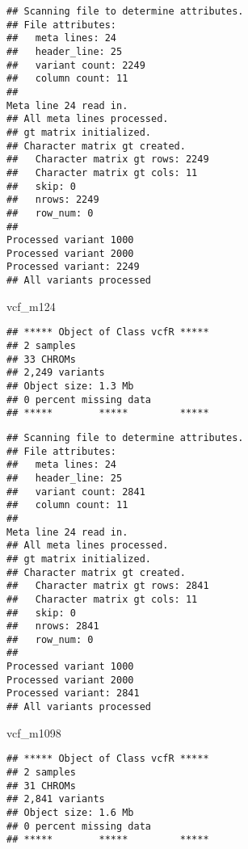 \documentclass[]{article}
\newenvironment{Shaded}{\begin{snugshade}}{\end{snugshade}}
\newcommand{\DataTypeTok}[1]{\textcolor[rgb]{0.13,0.29,0.53}{#1}}
\newcommand{\KeywordTok}[1]{\textcolor[rgb]{0.13,0.29,0.53}{\textbf{#1}}}
\newcommand{\NormalTok}[1]{#1}
\newcommand{\OperatorTok}[1]{\textcolor[rgb]{0.81,0.36,0.00}{\textbf{#1}}}
\newcommand{\StringTok}[1]{\textcolor[rgb]{0.31,0.60,0.02}{#1}}
\begin{document}
\begin{verbatim}
## Scanning file to determine attributes.
## File attributes:
##   meta lines: 24
##   header_line: 25
##   variant count: 2249
##   column count: 11
## 
Meta line 24 read in.
## All meta lines processed.
## gt matrix initialized.
## Character matrix gt created.
##   Character matrix gt rows: 2249
##   Character matrix gt cols: 11
##   skip: 0
##   nrows: 2249
##   row_num: 0
## 
Processed variant 1000
Processed variant 2000
Processed variant: 2249
## All variants processed
\end{verbatim}

\begin{Shaded}
\begin{Highlighting}[]
\NormalTok{vcf_m124}
\end{Highlighting}
\end{Shaded}

\begin{verbatim}
## ***** Object of Class vcfR *****
## 2 samples
## 33 CHROMs
## 2,249 variants
## Object size: 1.3 Mb
## 0 percent missing data
## *****        *****         *****
\end{verbatim}

\begin{Shaded}
\end{Shaded}

\begin{verbatim}
## Scanning file to determine attributes.
## File attributes:
##   meta lines: 24
##   header_line: 25
##   variant count: 2841
##   column count: 11
## 
Meta line 24 read in.
## All meta lines processed.
## gt matrix initialized.
## Character matrix gt created.
##   Character matrix gt rows: 2841
##   Character matrix gt cols: 11
##   skip: 0
##   nrows: 2841
##   row_num: 0
## 
Processed variant 1000
Processed variant 2000
Processed variant: 2841
## All variants processed
\end{verbatim}

\begin{Shaded}
\begin{Highlighting}[]
\NormalTok{vcf_m1098}
\end{Highlighting}
\end{Shaded}

\begin{verbatim}
## ***** Object of Class vcfR *****
## 2 samples
## 31 CHROMs
## 2,841 variants
## Object size: 1.6 Mb
## 0 percent missing data
## *****        *****         *****
\end{verbatim}
\end{document}
